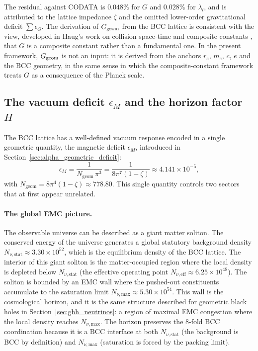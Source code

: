 \documentclass[10pt,a4paper]{article}
\begin{document}
The residual against CODATA is \(0.048\%\) for \(G\) and \(0.028\%\)
for \(\lambda_l\), and is attributed to the lattice impedance \(\zeta\)
and the omitted lower-order gravitational deficit
\(\sum\epsilon_G\). 
The derivation of \(G_{\rm geom}\) from the BCC lattice is consistent
with the view, developed in Haug's work on collision space-time and
composite constants
\cite{Haug2020PhysicsEssays,Haug2022Universe,Haug2024IJTP,Haug2026Astronomy},
that \(G\) is a composite constant rather than a fundamental one. In
the present framework, \(G_{\rm geom}\) is not an input: it is
derived from the anchors \(r_e\), \(m_e\), \(c\), \(e\) and the BCC
geometry, in the same sense in which the composite-constant framework
treats \(G\) as a consequence of the Planck scale.

\subsection{The vacuum deficit \texorpdfstring{\(\epsilon_M\)}{eps\_M} and the horizon factor \texorpdfstring{\(H\)}{H}}
\label{sec:cosmo_vacuum_chain}

The BCC lattice has a well-defined vacuum response encoded in a single
geometric quantity, the magnetic deficit \(\epsilon_M\), introduced in
Section~\ref{sec:alpha_geometric_deficit}:
\begin{equation}
	\epsilon_M = \frac{1}{N_{\text{geom}}\,\pi^3}
	= \frac{1}{8\pi^7(1-\zeta)}
	\approx 4.141 \times 10^{-5},
	\label{eq:cosmo_eps_M}
\end{equation}
with \(N_{\text{geom}} = 8\pi^4(1-\zeta) \approx 778.80\). This single
quantity controls two sectors that at first appear unrelated.

\paragraph{The global EMC picture.} The observable universe can be
described as a giant matter soliton. The conserved energy of the
universe generates a global statutory background density
\(N_{\nu,\text{stat}} \approx 3.30\times 10^{52}\), which is the
equilibrium density of the BCC lattice. The interior of this giant
soliton is the matter-occupied region where the local density is
depleted below \(N_{\nu,\text{stat}}\) (the effective operating point
\(N_{\nu,\text{eff}} \approx 6.25\times 10^{48}\)). The soliton is
bounded by an EMC wall where the pushed-out constituents accumulate
to the saturation limit
\(N_{\nu,\text{max}} \approx 5.30\times 10^{54}\). This wall is the
cosmological horizon, and it is the same structure described for
geometric black holes in Section~\ref{sec:gbh_neutrinos}: a region
of maximal EMC congestion where the local density reaches
\(N_{\nu,\text{max}}\). The horizon preserves the 8-fold BCC
coordination because it is a BCC interface at both
\(N_{\nu,\text{stat}}\) (the background is BCC by definition) and
\(N_{\nu,\text{max}}\) (saturation is forced by the packing limit).
\end{document}

